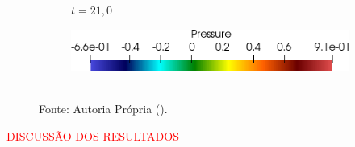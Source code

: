 \begin{figure}[h!]
\begin{subfigure}[b]{0.3\textwidth}
        \caption{$t=21,0$}
    \end{subfigure}
    \begin{subfigure}[b]{0.4\textwidth}
        \includegraphics[width=\linewidth]{Figuras/FSI-Cavity2D/legenda.png}
    \end{subfigure}
    \\Fonte: Autoria Própria (\the\year).
    \label{fig:cavity2D-time}
\end{figure}

\textcolor{red}{DISCUSSÃO DOS RESULTADOS}

\newpage

